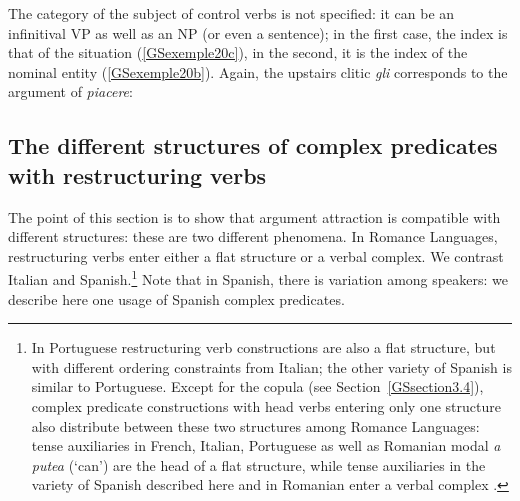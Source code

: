 \documentclass[output=paper
                ,modfonts
                ,nonflat
	        ,collection
	        ,collectionchapter
	        ,collectiontoclongg
 	        ,biblatex
                ,babelshorthands
                ,newtxmath
                ,draftmode
                ,colorlinks, citecolor=brown
]{./langsci/langscibook}
\begin{document}
{The category of the subject of control verbs is not specified: it can be an infinitival VP as well as an NP (or even a sentence); in the first case, the index is that of the situation (\ref{GSexemple20c}), in the second, it is the index of the nominal entity (\ref{GSexemple20b}). Again, the upstairs clitic \emph{gli} corresponds to the argument of \emph{piacere}:

\eal
\judgewidth{\%}
	\label{GSexemple20}
    \label{GSexemple20a}

	\label{GSexemple20b}		
		
	\label{GSexemple20c}	
\zl

\subsection{The different structures of complex predicates with restructuring verbs} \label{GSsection3.2}

The point of this section is to show that argument attraction is compatible with different structures: these are two different phenomena. In Romance Languages, restructuring verbs enter either a flat structure or a verbal complex. We contrast Italian and Spanish.\footnote{In Portuguese restructuring verb constructions are also a flat structure, but with different ordering constraints from Italian; the other variety of Spanish is similar to Portuguese. Except for the copula (see Section~\ref{GSsection3.4}), complex predicate constructions with head verbs entering only one structure also distribute between these two structures among Romance Languages: tense auxiliaries in French, Italian, Portuguese as well as Romanian modal \emph{a putea} (`can') are the head of a flat structure, while tense auxiliaries in the variety of Spanish described here and in Romanian enter a verbal complex \citep{AG2010}.} Note that in Spanish, there is variation among speakers: we describe here one usage of Spanish complex predicates. 

}
\end{document}
